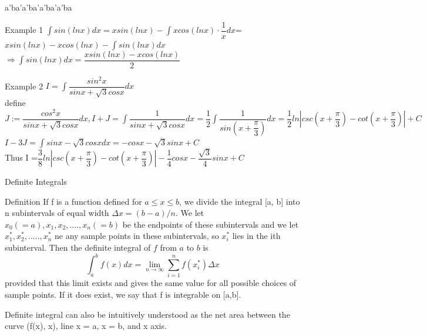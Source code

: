 \documentclass{beamer}
\begin{document}
\begin{frame}{a'ba'a'ba'a'ba'a'ba}
    \begin{block}{Example 1}
    $\int sin(lnx)dx=xsin(lnx)-\int xcos(lnx)\cdot\dfrac{1}{x}dx$=$xsin(lnx)-xcos(lnx)-\int sin(lnx)dx$
    $\Rightarrow\int sin(lnx)dx=\dfrac{xsin(lnx)-xcos(lnx)}{2}$
    \end{block}
    \begin{block}{Example 2}
    $I=\int \dfrac{sin^2x}{sinx+\sqrt{3}cosx}dx$\\
    define $J:=\dfrac{cos^2x}{sinx+\sqrt{3}cosx}dx, 
    I+J=\int \dfrac{1}{sinx+\sqrt{3}cosx}dx=\dfrac{1}{2}\int \dfrac{1}{sin(x+\dfrac{\pi}{3})}dx=\dfrac{1}{2}ln|csc(x+\dfrac{\pi}{3})-cot(x+\dfrac{\pi}{3})|+C$\\
    $I-3J=\int sinx-\sqrt{3}cosxdx=-cosx-\sqrt{3}sinx+C$\\
    Thus I =$\dfrac{3}{8}ln|csc(x+\dfrac{\pi}{3})-cot(x+\dfrac{\pi}{3})|-\dfrac{1}{4}cosx-\dfrac{\sqrt{3}}{4}sinx+C$
    \end{block}
\end{frame}
\begin{frame}{Definite Integrals}
    \begin{block}{Definition}
    If f is a function defined for $a \leq x \leq b$, we divide the integral [a, b] into n subintervals of equal width $\Delta x = (b-a)/n$. We let $x_0(=a), x_1, x_2, ...., x_n(=b)$ be the endpoints of these subintervals and we let $x_1^*, x_2^*, .....,x_n^*$ ne any sample points in these subintervals, so $x_i^*$ lies in the ith subinterval. Then the definite integral of $f$ from $a$ to $b$ is
    \begin{equation*}
        \int_a^b f(x)dx = \lim\limits_{n \to \infty} \sum_{i = 1}^n f(x_i^*)\Delta x
    \end{equation*}
    provided that this limit exists and gives the same value for all possible choices of sample points. If it does exist, we say that f is integrable on [a,b].
    \end{block}
    Definite integral can also be intuitively understood as the net area between the curve (f(x), x), line x = a, x = b, and x axis.
\end{frame}
\end{document}
